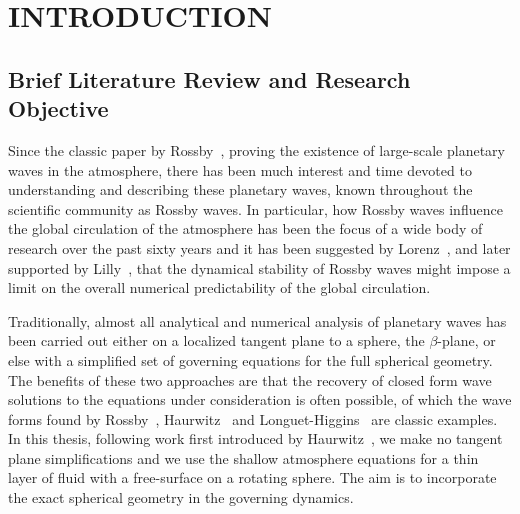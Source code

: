 

\chapter[INTRODUCTION]{INTRODUCTION}
\label{chap:1}
\section{Brief Literature Review and Research Objective}
Since the classic paper by Rossby~\cite{Rossby:RBV}, proving the existence of large-scale planetary waves in the atmosphere, there has been much interest and time devoted to understanding and describing these planetary waves, known throughout the scientific community as Rossby waves. In particular, how Rossby waves influence the global circulation of the atmosphere has been the focus of a wide body of research over the past sixty years and it has been suggested by Lorenz~\cite{Lorenz:BIR}, and later supported by Lilly~\cite{Lilly:NBI}, that the dynamical stability of Rossby waves might impose a limit on the overall numerical predictability of the global circulation.

Traditionally, almost all analytical and numerical analysis of planetary waves has been carried out either on a localized tangent plane to a sphere, the $\beta$-plane, or else with a simplified set of governing equations for the full spherical geometry. The benefits of these two approaches are that the recovery of closed form wave solutions to the equations under consideration is often possible, of which the wave forms found by Rossby~\cite{Rossby:RBV}, Haurwitz~\cite{Haurwitz:MAD} and Longuet-Higgins~\cite{Longuet:PWRS1,Longuet:PWRS2} are classic examples. In this thesis, following work first introduced by Haurwitz~\cite{Haurwitz:MAD}, we make no tangent plane simplifications and we use the shallow atmosphere equations for a thin layer of fluid with a free-surface on a rotating sphere. The aim is to incorporate the exact spherical geometry in the governing dynamics. 

